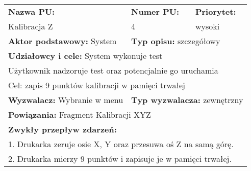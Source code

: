\documentclass{article}
\begin{document}
\begin{enumerate}[label=\arabic*.]
\newpage
\begin{tabular}{|p{5cm}|p{3cm}|p{3cm}|p{3cm}|p{}|p{3cm}|}
\hline
\multicolumn{4}{|l|}{\textbf{Nazwa PU:} } & \multicolumn{1}{l|}{\textbf{Numer PU:}} & \multicolumn{1}{|l|}{\textbf{Priorytet:}} \\ 
\multicolumn{4}{|l|}{Kalibracja Z} & \multicolumn{1}{l|}{4} & \multicolumn{1}{|l|}{wysoki}\\ \hline
\multicolumn{3}{|l|}{\textbf{Aktor podstawowy:} System} & \multicolumn{3}{l|}{\textbf{Typ opisu:} szczegółowy} \\ \hline
\multicolumn{6}{|l|}{\textbf{Udziałowcy i cele:} System wykonuje test} \\ 
\multicolumn{6}{|l|}{Użytkownik nadzoruje test oraz potencjalnie go uruchamia} \\
\multicolumn{6}{|l|}{Cel: zapis 9 punktów kalibracji w pamięci trwałej} \\ \hline
\multicolumn{3}{|l|}{\textbf{Wyzwalacz:} Wybranie w menu} & \multicolumn{3}{l|}{\textbf{Typ wyzwalacza:} zewnętrzny} \\ \hline
\multicolumn{6}{|l|}{\textbf{Powiązania:} Fragment Kalibracji XYZ} \\
\hline
\multicolumn{6}{|l|}{\textbf{Zwykły przepływ zdarzeń:}} \\
\multicolumn{6}{|l|}{1. Drukarka zeruje osie X, Y oraz przesuwa oś Z na samą górę. } \\
\multicolumn{6}{|l|}{2. Drukarka mierzy 9 punktów i zapisuje je w pamięci trwałej.} \\
\hline


\end{tabular}
\end{enumerate}
\end{document}
